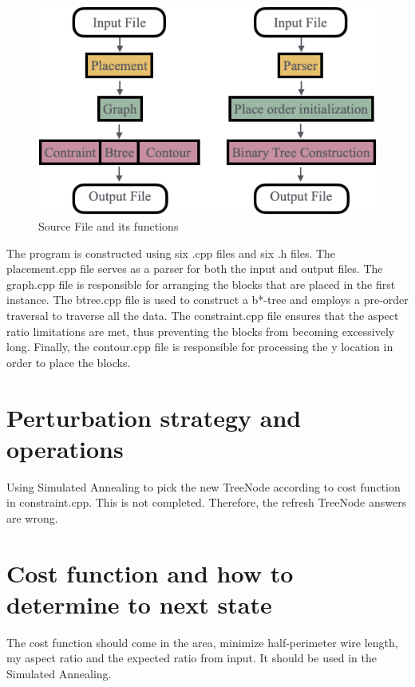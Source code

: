 \documentclass{article}
\begin{document}
  \begin{figure}[H]
    \centering
    \includegraphics[width=0.5\linewidth]{./img/2024-05-26-20-41-36.png}
    \caption{Source File and its functions}
    \label{file order}
  \end{figure}


  The program is constructed using six .cpp files and six .h files. The placement.cpp file serves as a parser for both the input and output files. The graph.cpp file is responsible for arranging the blocks that are placed in the first instance. The btree.cpp file is used to construct a b*-tree and employs a pre-order traversal to traverse all the data. The constraint.cpp file ensures that the aspect ratio limitations are met, thus preventing the blocks from becoming excessively long. Finally, the contour.cpp file is responsible for processing the y location in order to place the blocks.

\section{Perturbation strategy and operations}

Using Simulated Annealing to pick the new TreeNode according to cost function in constraint.cpp. This is not completed. Therefore, the refresh TreeNode answers are wrong.



\section{Cost function and how to determine to next state}

The cost function should come in the area, minimize half-perimeter wire length, my aspect ratio and the expected ratio from input. It should be used in the Simulated Annealing.


\end{document}
